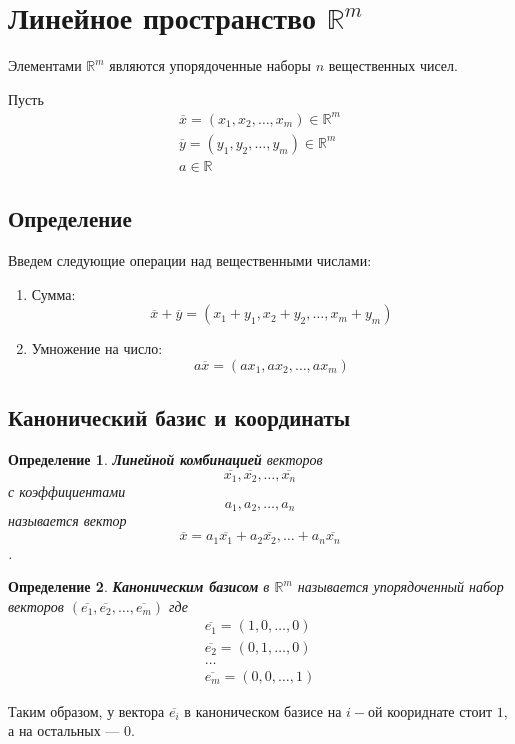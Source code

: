 \documentclass[]{article}
\newtheorem{dfn}{Определение}
\begin{document}
	\section{Линейное пространство $\mathbb{R}^m$}
	
	Элементами $\mathbb{R}^m$ являются упорядоченные наборы $n$ вещественных чисел.
	
	Пусть \begin{gather*}
		\overline{x}=(x_1, x_2, \ldots, x_m)\in \mathbb{R}^m 
		\\
		\overline{y}=(y_1, y_2, \ldots, y_m)\in \mathbb{R}^m 
		\\
		a\in \mathbb{R}
	\end{gather*}
	\subsection{Определение}
	Введем следующие операции над вещественными числами:\begin{enumerate}
		\item Сумма: $$\overline{x}+\overline{y}=
		(x_1+y_1, x_2+y_2, \ldots, x_m+y_m)$$
		\item Умножение на число: $$a\overline{x}=
		(ax_1, ax_2, \ldots, ax_m)$$
	\end{enumerate}
	
	
	\subsection{Канонический базис и координаты}
	\begin{dfn}
		\textbf{Линейной комбинацией} векторов 
		$$
		\overline{x_1}, \overline{x_2},\ldots, \overline{x_n}
		$$
		с коэффициентами 
		$$
		a_1,a_2,\ldots, a_n
		$$
		называется вектор $$\overline{x}=a_1\overline{x_1}+ a_2\overline{x_2},\ldots+ a_n\overline{x_n}$$.
	\end{dfn}
	
	\begin{dfn}
		\textbf{Каноническим базисом} в $\mathbb{R}^m$ называется упорядоченный набор векторов $(\overline{e_1}, \overline{e_2}, \ldots, \overline{e_m})$ где
		\begin{gather*}
			\overline{e_1} = (1,0,\ldots,0)
			\\
			\overline{e_2} = (0,1,\ldots,0)
			\\
			\ldots
			\\
			\overline{e_m} = (0,0,\ldots,1)
		\end{gather*}
	\end{dfn}
	Таким образом, у вектора $\overline{e_i}$ в каноническом базисе на $i-$ой коориднате стоит $1$, а на остальных --- $0$.
	
\end{document}
